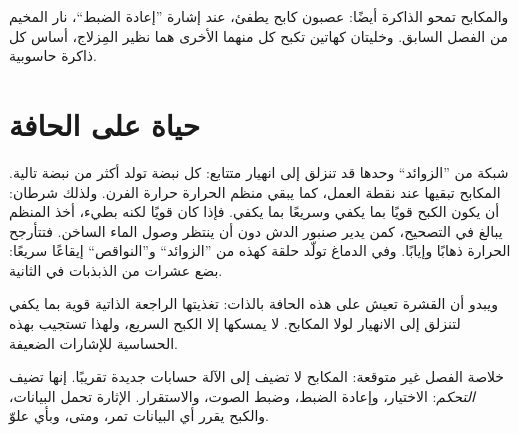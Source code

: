 والمكابح تمحو الذاكرة أيضًا: عصبون كابح يطفئ، عند إشارة ”إعادة الضبط“، نار المخيم من الفصل السابق. وخليتان كهاتين تكبح كل منهما الأخرى هما نظير المِزلاج، أساس كل ذاكرة حاسوبية.

\section*{حياة على الحافة}

شبكة من ”الزوائد“ وحدها قد تنزلق إلى انهيار متتابع: كل نبضة تولد أكثر من نبضة تالية. المكابح تبقيها عند نقطة العمل، كما يبقي منظم الحرارة حرارة الفرن. ولذلك شرطان: أن يكون الكبح قويًا بما يكفي وسريعًا بما يكفي. فإذا كان قويًا لكنه بطيء، أخذ المنظم يبالغ في التصحيح، كمن يدير صنبور الدش دون أن ينتظر وصول الماء الساخن. فتتأرجح الحرارة ذهابًا وإيابًا. وفي الدماغ تولّد حلقة كهذه من ”الزوائد“ و”النواقص“ إيقاعًا سريعًا: بضع عشرات من الذبذبات في الثانية.

ويبدو أن القشرة تعيش على هذه الحافة بالذات: تغذيتها الراجعة الذاتية قوية بما يكفي لتنزلق إلى الانهيار لولا المكابح. لا يمسكها إلا الكبح السريع، ولهذا تستجيب بهذه الحساسية للإشارات الضعيفة.

خلاصة الفصل غير متوقعة: المكابح لا تضيف إلى الآلة حسابات جديدة تقريبًا. إنها تضيف \emph{التحكم}: الاختيار، وإعادة الضبط، وضبط الصوت، والاستقرار. الإثارة تحمل البيانات، والكبح يقرر أي البيانات تمر، ومتى، وبأي علوّ.

